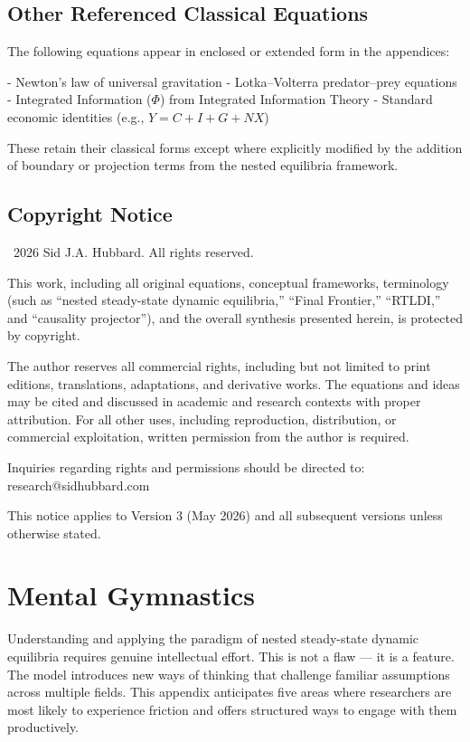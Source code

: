 \section{Other Referenced Classical Equations}

The following equations appear in enclosed or extended form in the appendices:

- Newton’s law of universal gravitation
- Lotka–Volterra predator–prey equations
- Integrated Information (\(\Phi\)) from Integrated Information Theory
- Standard economic identities (e.g., $Y = C + I + G + NX$)

These retain their classical forms except where explicitly modified by the addition of boundary or projection terms from the nested equilibria framework.

\section{Copyright Notice}

\textcopyright\ 2026 Sid J.A. Hubbard. All rights reserved.

This work, including all original equations, conceptual frameworks, terminology (such as “nested steady-state dynamic equilibria,” “Final Frontier,” “RTLDI,” and “causality projector”), and the overall synthesis presented herein, is protected by copyright.

The author reserves all commercial rights, including but not limited to print editions, translations, adaptations, and derivative works. The equations and ideas may be cited and discussed in academic and research contexts with proper attribution. For all other uses, including reproduction, distribution, or commercial exploitation, written permission from the author is required.

Inquiries regarding rights and permissions should be directed to: research@sidhubbard.com

This notice applies to Version 3 (May 2026) and all subsequent versions unless otherwise stated.

\chapter{Mental Gymnastics}

Understanding and applying the paradigm of nested steady-state dynamic equilibria requires genuine intellectual effort. This is not a flaw — it is a feature. The model introduces new ways of thinking that challenge familiar assumptions across multiple fields. This appendix anticipates five areas where researchers are most likely to experience friction and offers structured ways to engage with them productively.

